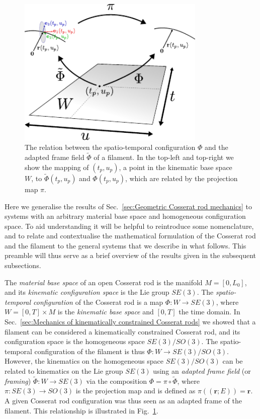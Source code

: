 \begin{figure}[t]
\centering
        \includegraphics[width=0.8\textwidth]{figs_part2/ch8_geometrisation/cosserat_geometrisation.pdf}
        \caption{The relation between the spatio-temporal configuration $\Phi$ and the adapted frame field $\tilde{\Phi}$ of a filament. In the top-left and top-right we show the mapping of $(t_p, u_p)$, a point in the kinematic base space $W$, to $\tilde{\Phi}(t_p, u_p)$ and $\Phi(t_p, u_p)$, which are related by the projection map $\pi$.}\label{fig:cosserat rod geometrisation illustration}
\end{figure}

Here we generalise the results of Sec.~\ref{sec:Geometric Cosserat rod mechanics} to systems with an arbitrary material base space and homogeneous configuration space. To aid understanding it will be helpful to reintroduce some nomenclature, and to relate and contextualise the mathematical formulation of the Cosserat rod and the filament to the general systems that we describe in what follows. This preamble will thus serve as a brief overview of the results given in the subsequent subsections.

The \textit{material base space} of an open Cosserat rod is the manifold $M = [0, L_0]$, and its \textit{kinematic configuration space} is the Lie group $SE(3)$. The \textit{spatio-temporal configuration} of the Cosserat rod is a map $\Phi : W \to SE(3)$, where $W = [0,T] \times M$ is the \textit{kinematic base space} and $[0,T]$ the time domain. In Sec.~\ref{sec:Mechanics of kinematically constrained Cosserat rods} we showed that a filament can be considered a kinematically constrained Cosserat rod, and its configuration space is the homogeneous space $SE(3)/SO(3)$. The spatio-temporal configuration of the filament is thus $\Phi : W \to SE(3) / SO(3)$. However, the kinematics on the homogeneous space $SE(3) / SO(3)$ can be related to kinematics on the Lie group $SE(3)$ using an \textit{adapted frame field} (or \textit{framing}) $\tilde{\Phi} : W \to SE(3)$ via the composition $\Phi = \pi \circ \tilde{\Phi}$, where $\pi : SE(3) \to SO(3)$ is the projection map and is defined as $\pi((\mathbf{r} ; E)) = \mathbf{r}$. A given Cosserat rod configuration was thus seen as an adapted frame of the filament. This relationship is illustrated in Fig.~\ref{fig:cosserat rod geometrisation illustration}.

